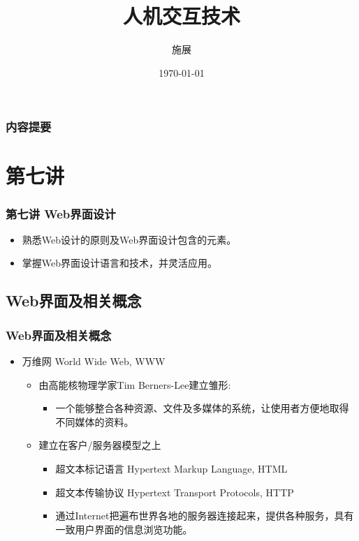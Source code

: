 \documentclass{beamer}
\title{人机交互技术}
\author{施展}
\institute{华中科技大学~武汉光电国家实验室}
\date{\today}
\begin{document}
\begin{frame}
	\titlepage
\end{frame}

\begin{frame}
	\frametitle{内容提要}
	\tableofcontents
\end{frame}

\section{第七讲}
\begin{frame}
	\frametitle{第七讲 Web界面设计}
	\begin{itemize}
		\item 熟悉Web设计的原则及Web界面设计包含的元素。
		\item 掌握Web界面设计语言和技术，并灵活应用。
	\end{itemize}
\end{frame}

\subsection{Web界面及相关概念}
\begin{frame}
	\frametitle{Web界面及相关概念}
	\beamertemplatetransparentcovereddynamicmedium
	\begin{itemize}[<+->]
		\item 万维网 World Wide Web, WWW
		\begin{itemize}
			\item 由高能核物理学家Tim Berners-Lee建立雏形:
			\begin{itemize}
				\item 一个能够整合各种资源、文件及多媒体的系统，让使用者方便地取得不同媒体的资料。
			\end{itemize}
			\item 建立在客户/服务器模型之上
			\begin{itemize}
				\item 超文本标记语言 Hypertext Markup Language, HTML~\cite{berners1995hypertext}
				\item 超文本传输协议 Hypertext Transport Protocols, HTTP~\cite{fielding1999hypertext}
				\item 通过Internet把遍布世界各地的服务器连接起来，提供各种服务，具有一致用户界面的信息浏览功能。
			\end{itemize}
		\end{itemize}
	\end{itemize}
\end{frame}
\end{document}
